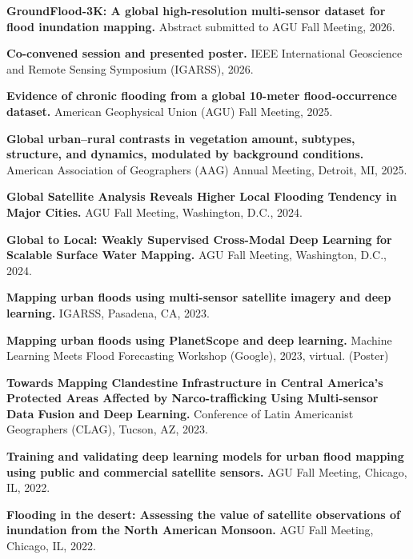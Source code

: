 \documentclass[10pt,letterpaper]{article}
\begin{document}
\begin{entrylist}
  \item \textbf{GroundFlood-3K: A global high-resolution multi-sensor dataset for flood inundation mapping.}
  Abstract submitted to AGU Fall Meeting, 2026.

  \item \textbf{Co-convened session and presented poster.}
  IEEE International Geoscience and Remote Sensing Symposium (IGARSS), 2026.

  \item \textbf{Evidence of chronic flooding from a global 10-meter flood-occurrence dataset.}
  American Geophysical Union (AGU) Fall Meeting, 2025.

  \item \textbf{Global urban--rural contrasts in vegetation amount, subtypes, structure, and dynamics, modulated by background conditions.}
  American Association of Geographers (AAG) Annual Meeting, Detroit, MI, 2025.

  \item \textbf{Global Satellite Analysis Reveals Higher Local Flooding Tendency in Major Cities.}
  AGU Fall Meeting, Washington, D.C., 2024.

  \item \textbf{Global to Local: Weakly Supervised Cross-Modal Deep Learning for Scalable Surface Water Mapping.}
  AGU Fall Meeting, Washington, D.C., 2024.

  \item \textbf{Mapping urban floods using multi-sensor satellite imagery and deep learning.}
  IGARSS, Pasadena, CA, 2023.

  \item \textbf{Mapping urban floods using PlanetScope and deep learning.}
  Machine Learning Meets Flood Forecasting Workshop (Google), 2023, virtual. (Poster)

  \item \textbf{Towards Mapping Clandestine Infrastructure in Central America's Protected Areas Affected by Narco-trafficking Using Multi-sensor Data Fusion and Deep Learning.}
  Conference of Latin Americanist Geographers (CLAG), Tucson, AZ, 2023.

  \item \textbf{Training and validating deep learning models for urban flood mapping using public and commercial satellite sensors.}
  AGU Fall Meeting, Chicago, IL, 2022.

  \item \textbf{Flooding in the desert: Assessing the value of satellite observations of inundation from the North American Monsoon.}
  AGU Fall Meeting, Chicago, IL, 2022.


\end{entrylist}
\end{document}

